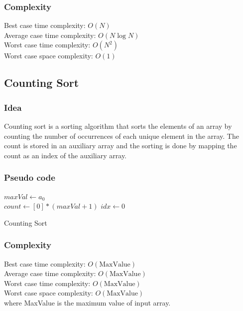 \documentclass[11pt,a4paper]{article}
\begin{document}
\subsubsection*{Complexity}
Best case time complexity: $O(N)$ \\
Average case time complexity: $O(N \log N)$\\
Worst case time complexity: $O(N^2)$ \\
Worst case space complexity: $O(1)$

\subsection{Counting Sort}
\subsubsection*{Idea}
Counting sort is a sorting algorithm that sorts the elements of an array by counting the number of occurrences of each unique element in the array. 
The count is stored in an auxiliary array and the sorting is done by mapping the count as an index of the auxiliary array.

\subsubsection*{Pseudo code}
\begin{algorithm2e}
  \SetAlgoLined
  $maxVal \gets a_0$\\
  $count \gets [0]*(maxVal+1)$ 
  $idx \gets 0$\\
  
  \caption{Counting Sort}
\end{algorithm2e}

\subsubsection*{Complexity}
Best case time complexity: $O(\text{MaxValue})$ \\
Average case time complexity: $O(\text{MaxValue})$\\
Worst case time complexity: $O(\text{MaxValue})$ \\
Worst case space complexity: $O(\text{MaxValue})$\\
where MaxValue is the maximum value of input array.
\end{document}
